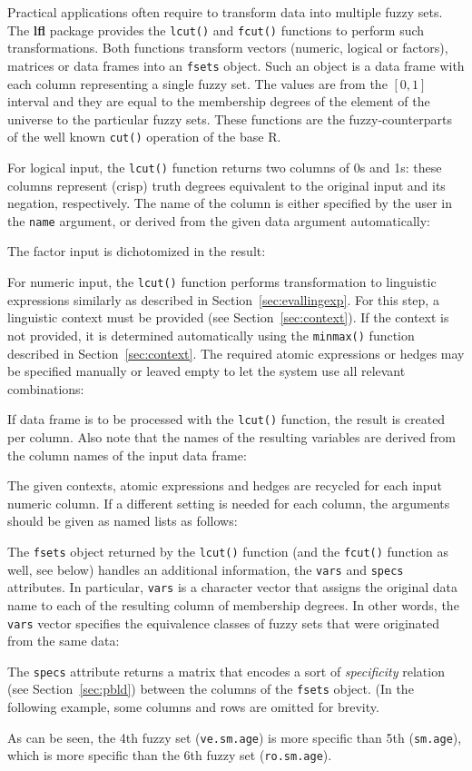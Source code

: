 \documentclass[review]{elsarticle}
\newcommand{\pkg}[1]{\textbf{#1}}
\newcommand{\proglang}[1]{#1}
\newcommand{\code}[1]{\texttt{#1}}
\newcommand{\R}{\proglang{R}}
\begin{document}
Practical applications often require to transform data into multiple fuzzy sets. The \pkg{lfl} package provides the \code{lcut()} and \code{fcut()} functions to perform such transformations. Both functions transform vectors (numeric, logical or factors), matrices or data frames into an \code{fsets} object. Such an object is a data frame with each column representing a single fuzzy set. The values are from the $[0, 1]$ interval and they are equal to the membership degrees of the element of the universe to the particular fuzzy sets. These functions are the fuzzy-counterparts of the well known \code{cut()} operation of the base \R{}.

For logical input, the \code{lcut()} function returns two columns of 0s and 1s: these columns represent (crisp) truth degrees equivalent to the original input and its negation, respectively. The name of the column is either specified by the user in the \code{name} argument, or derived from the given data argument automatically:
%

%
The factor input is dichotomized in the result:
%


For numeric input, the \code{lcut()} function performs transformation to linguistic expressions similarly as described in Section~\ref{sec:evallingexp}. For this step, a linguistic context must be provided (see Section~\ref{sec:context}). If the context is not provided, it is determined automatically using the \code{minmax()} function described in Section~\ref{sec:context}. The required atomic expressions or hedges may be specified manually or leaved empty to let the system use all relevant combinations:
%


If data frame is to be processed with the \code{lcut()} function, the result is created per column. Also note that the names of the resulting variables are derived from the column names of the input data frame:
%

%
The given contexts, atomic expressions and hedges are recycled for each input numeric column. If a different setting is needed for each column, the arguments should be given as named lists as follows:
%



The \code{fsets} object returned by the \code{lcut()} function (and the \code{fcut()} function as well, see below) handles an additional information, the \code{vars} and \code{specs} attributes. In particular, \code{vars} is a character vector that assigns the original data name to each of the resulting column of membership degrees. In other words, the \code{vars} vector specifies the equivalence classes of fuzzy sets that were originated from the same data:
%

%
The \code{specs} attribute returns a matrix that encodes a sort of \emph{specificity} relation (see Section~\ref{sec:pbld}) between the columns of the \code{fsets} object. (In the following example, some columns and rows are omitted for brevity.
%

%
As can be seen, the 4th fuzzy set (\code{ve.sm.age}) is more specific than 5th (\code{sm.age}), which is more specific than the 6th fuzzy set (\code{ro.sm.age}).
\end{document}
